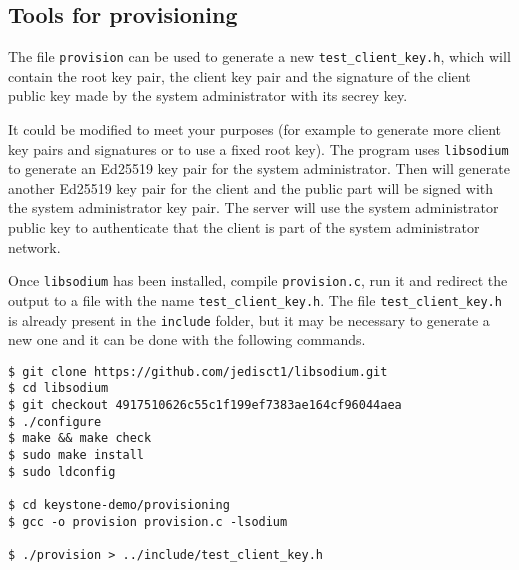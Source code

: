 \subsection{Tools for provisioning}

The file \texttt{provision} can be used to generate a new \texttt{test\_client\_key.h}, which will contain the root key pair, the client key pair and the signature of the client public key made by the system administrator with its secrey key. 

It could be modified to meet your purposes (for example to generate more client key pairs and signatures or to use a fixed root key).
The program uses \texttt{libsodium} to generate an Ed25519 key pair for the system administrator. Then will generate another Ed25519 key pair for the client and the public part will be signed with the system administrator key pair. The server will use the system administrator public key to authenticate that the client is part of the system administrator network.
 
Once \texttt{libsodium}  has been installed, compile \texttt{provision.c}, run it and redirect the output to a file with the name \texttt{test\_client\_key.h}. 
The file \texttt{test\_client\_key.h} is already present in the \texttt{include} folder, but it may be necessary to generate a new one and it can be done with the following commands. \\

\begin{lstlisting}[style=terminal,frame=single]
$ git clone https://github.com/jedisct1/libsodium.git
$ cd libsodium
$ git checkout 4917510626c55c1f199ef7383ae164cf96044aea
$ ./configure
$ make && make check
$ sudo make install
$ sudo ldconfig

$ cd keystone-demo/provisioning
$ gcc -o provision provision.c -lsodium

$ ./provision > ../include/test_client_key.h
\end{lstlisting}